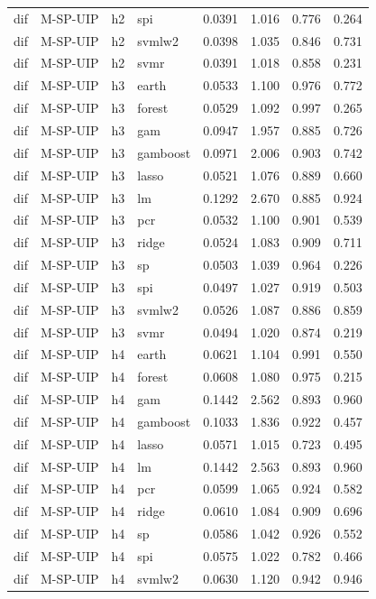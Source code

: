 \begin{ThreePartTable}
\begin{longtable}[t]{llclcccc}
dif & M-SP-UIP & h2 & spi & 0.0391 & 1.016 & 0.776 & 0.264\\
dif & M-SP-UIP & h2 & svmlw2 & 0.0398 & 1.035 & 0.846 & 0.731\\
dif & M-SP-UIP & h2 & svmr & 0.0391 & 1.018 & 0.858 & 0.231\\
\addlinespace
dif & M-SP-UIP & h3 & earth & 0.0533 & 1.100 & 0.976 & 0.772\\
dif & M-SP-UIP & h3 & forest & 0.0529 & 1.092 & 0.997 & 0.265\\
dif & M-SP-UIP & h3 & gam & 0.0947 & 1.957 & 0.885 & 0.726\\
dif & M-SP-UIP & h3 & gamboost & 0.0971 & 2.006 & 0.903 & 0.742\\
dif & M-SP-UIP & h3 & lasso & 0.0521 & 1.076 & 0.889 & 0.660\\
dif & M-SP-UIP & h3 & lm & 0.1292 & 2.670 & 0.885 & 0.924\\
dif & M-SP-UIP & h3 & pcr & 0.0532 & 1.100 & 0.901 & 0.539\\
dif & M-SP-UIP & h3 & ridge & 0.0524 & 1.083 & 0.909 & 0.711\\
dif & M-SP-UIP & h3 & sp & 0.0503 & 1.039 & 0.964 & 0.226\\
dif & M-SP-UIP & h3 & spi & 0.0497 & 1.027 & 0.919 & 0.503\\
dif & M-SP-UIP & h3 & svmlw2 & 0.0526 & 1.087 & 0.886 & 0.859\\
dif & M-SP-UIP & h3 & svmr & 0.0494 & 1.020 & 0.874 & 0.219\\
\addlinespace
dif & M-SP-UIP & h4 & earth & 0.0621 & 1.104 & 0.991 & 0.550\\
dif & M-SP-UIP & h4 & forest & 0.0608 & 1.080 & 0.975 & 0.215\\
dif & M-SP-UIP & h4 & gam & 0.1442 & 2.562 & 0.893 & 0.960\\
dif & M-SP-UIP & h4 & gamboost & 0.1033 & 1.836 & 0.922 & 0.457\\
dif & M-SP-UIP & h4 & lasso & 0.0571 & 1.015 & 0.723 & 0.495\\
dif & M-SP-UIP & h4 & lm & 0.1442 & 2.563 & 0.893 & 0.960\\
dif & M-SP-UIP & h4 & pcr & 0.0599 & 1.065 & 0.924 & 0.582\\
dif & M-SP-UIP & h4 & ridge & 0.0610 & 1.084 & 0.909 & 0.696\\
dif & M-SP-UIP & h4 & sp & 0.0586 & 1.042 & 0.926 & 0.552\\
dif & M-SP-UIP & h4 & spi & 0.0575 & 1.022 & 0.782 & 0.466\\
dif & M-SP-UIP & h4 & svmlw2 & 0.0630 & 1.120 & 0.942 & 0.946\\

\end{longtable}
\end{ThreePartTable}
